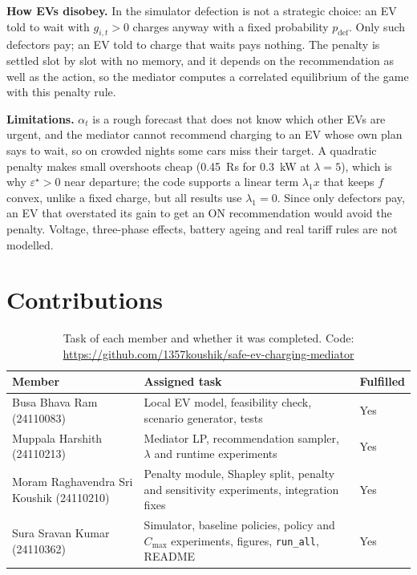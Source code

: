 \documentclass{article}
\newcommand{\cmax}{C_{\max}}
\begin{document}
\textbf{How EVs disobey.} In the simulator defection is not a strategic choice: an EV told to wait with $g_{i,t} > 0$ charges anyway with a fixed probability $p_{\mathrm{def}}$. Only such defectors pay; an EV told to charge that waits pays nothing. The penalty is settled slot by slot with no memory, and it depends on the recommendation as well as the action, so the mediator computes a correlated equilibrium of the game with this penalty rule.

\textbf{Limitations.} $\alpha_t$ is a rough forecast that does not know which other EVs are urgent, and the mediator cannot recommend charging to an EV whose own plan says to wait, so on crowded nights some cars miss their target. A quadratic penalty makes small overshoots cheap (0.45~Rs for 0.3~kW at $\lambda = 5$), which is why $\varepsilon^\star > 0$ near departure; the code supports a linear term $\lambda_1 x$ that keeps $f$ convex, unlike a fixed charge, but all results use $\lambda_1 = 0$. Since only defectors pay, an EV that overstated its gain to get an ON recommendation would avoid the penalty. Voltage, three-phase effects, battery ageing and real tariff rules are not modelled.

\section{Contributions}

\begin{table}[!htb]
\centering
\small
\caption{Task of each member and whether it was completed. Code: \url{https://github.com/1357koushik/safe-ev-charging-mediator}}
\label{tab:contrib}
\begin{tabularx}{\textwidth}{lXl}
\toprule
Member & Assigned task & Fulfilled \\
\midrule
Busa Bhava Ram (24110083) & Local EV model, feasibility check, scenario generator, tests & Yes \\
Muppala Harshith (24110213) & Mediator LP, recommendation sampler, $\lambda$ and runtime experiments & Yes \\
Moram Raghavendra Sri Koushik (24110210) & Penalty module, Shapley split, penalty and sensitivity experiments, integration fixes & Yes \\
Sura Sravan Kumar (24110362) & Simulator, baseline policies, policy and $\cmax$ experiments, figures, \texttt{run\_all}, README & Yes \\
\bottomrule
\end{tabularx}
\end{table}
\end{document}
